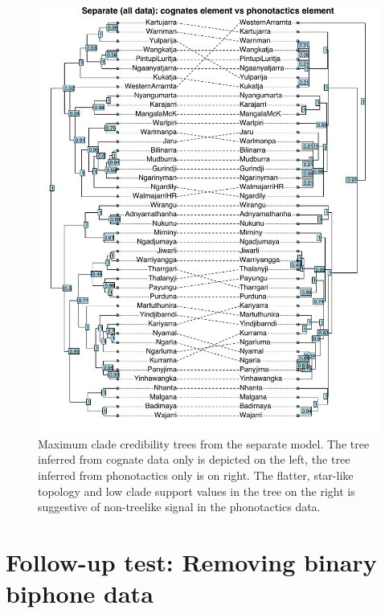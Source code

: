 \begin{figure}
\centering
\includegraphics{06-tree-inference/fig/separate_cogs_vs_phonotactics_alldata.pdf}
\caption[Maximum clade credibility trees from the separate model]{\label{fig:separate-cogs-vs-phonotactics-all}Maximum clade credibility trees from the separate model. The tree inferred from cognate data only is depicted on the left, the tree inferred from phonotactics only is on right. The flatter, star-like topology and low clade support values in the tree on the right is suggestive of non-treelike signal in the phonotactics data.}
\end{figure}

\hypertarget{follow-up-test}{%
\section{Follow-up test: Removing binary biphone data}\label{follow-up-test}}


